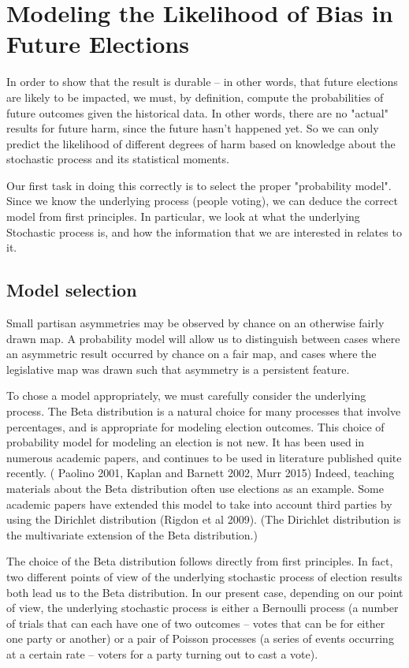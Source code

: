 \documentclass[preprint,12pt]{article}
\begin{document}
\section{Modeling the Likelihood of Bias in Future Elections\label{sec:FB}}
 
In order to show that the result is durable -- in other words, that future elections are likely to be impacted, we must, by definition, compute the probabilities of future outcomes given the historical data.  In other words, there are no "actual" results for future harm, since the future hasn't happened yet.  So we can only predict the likelihood of different degrees of harm based on knowledge about the stochastic process and its statistical moments.
 
Our first task in doing this correctly is to select the proper "probability model".  Since we know the underlying process (people voting), we can deduce the correct model from first principles.  In particular, we look at what the underlying Stochastic process is, and how the information that we are interested in relates to it.
 
\subsection{Model selection}
 
Small partisan asymmetries may be observed by chance on an otherwise fairly drawn map. A probability model will allow us to distinguish between cases where an asymmetric result occurred by chance on a fair map, and cases where the legislative map was drawn such that asymmetry is a persistent feature. 
 
To chose a model appropriately, we must carefully consider the underlying process. The Beta distribution is a natural choice for many processes that involve percentages, and is appropriate for modeling election outcomes. This choice of probability model for modeling an election is not new. It has been used in numerous academic papers, and continues to be used in literature published quite recently. ( Paolino 2001, Kaplan and Barnett 2002, Murr 2015)  Indeed, teaching materials about the Beta distribution often use elections as an example.  Some academic papers have extended this model to take into account third parties by using the Dirichlet distribution (Rigdon et al 2009).  (The Dirichlet distribution is the multivariate extension of the Beta distribution.) 
 
The choice of the Beta distribution follows directly from first principles. In fact, two different points of view of the underlying stochastic process of election results both lead us to the Beta distribution. In our present case, depending on our point of view, the underlying stochastic process is either a Bernoulli process (a number of trials that can each have one of two outcomes -- votes that can be for either one party or another) or a pair of Poisson processes (a series of events occurring at a certain rate -- voters for a party turning out to cast a vote).  
 
\end{document}
